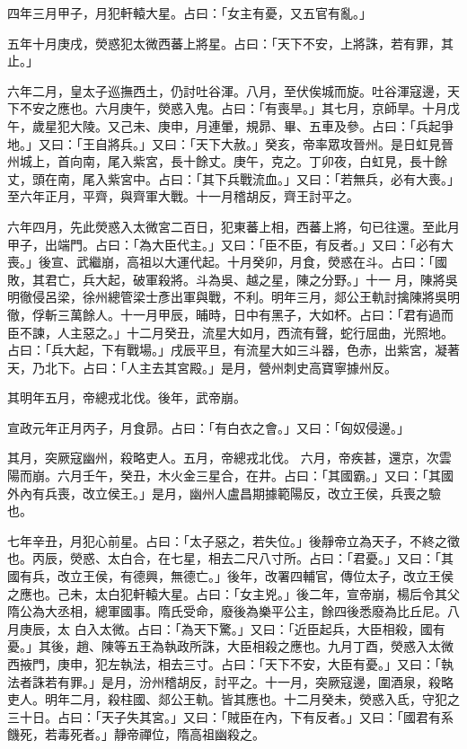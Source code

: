 \begin{pinyinscope}
 四年三月甲子，月犯軒轅大星。占曰：「女主有憂，又五官有亂。」



 五年十月庚戌，熒惑犯太微西蕃上將星。占曰：「天下不安，上將誅，若有罪，其止。」



 六年二月，皇太子巡撫西土，仍討吐谷渾。八月，至伏俟城而旋。吐谷渾寇邊，天下不安之應也。六月庚午，熒惑入鬼。占曰：「有喪旱。」其七月，京師旱。十月戊午，歲星犯大陵。又己未、庚申，月連暈，規昴、畢、五車及參。占曰：「兵起爭
 地。」又曰：「王自將兵。」又曰：「天下大赦。」癸亥，帝率眾攻晉州。是日虹見晉州城上，首向南，尾入紫宮，長十餘丈。庚午，克之。丁卯夜，白虹見，長十餘丈，頭在南，尾入紫宮中。占曰：「其下兵戰流血。」又曰：「若無兵，必有大喪。」至六年正月，平齊，與齊軍大戰。十一月稽胡反，齊王討平之。



 六年四月，先此熒惑入太微宮二百日，犯東蕃上相，西蕃上將，句已往還。至此月甲子，出端門。占曰：「為大臣代主。」又曰：「臣不臣，有反者。」又曰：「必有大喪。」後宣、武繼崩，高祖以大運代起。十月癸卯，月食，熒惑在斗。占曰：「國敗，其君亡，兵大起，破軍殺將。斗為吳、越之星，陳之分野。」十一
 月，陳將吳明徹侵呂梁，徐州總管梁士彥出軍與戰，不利。明年三月，郯公王軌討擒陳將吳明徹，俘斬三萬餘人。十一月甲辰，晡時，日中有黑子，大如杯。占曰：「君有過而臣不諫，人主惡之。」十二月癸丑，流星大如月，西流有聲，蛇行屈曲，光照地。占曰：「兵大起，下有戰場。」戌辰平旦，有流星大如三斗器，色赤，出紫宮，凝著天，乃北下。占曰：「人主去其宮殿。」是月，營州刺史高寶寧據州反。



 其明年五月，帝總戎北伐。後年，武帝崩。



 宣政元年正月丙子，月食昴。占曰：「有白衣之會。」又曰：「匈奴侵邊。」



 其月，突厥寇幽州，殺略吏人。五月，帝總戎北伐。
 六月，帝疾甚，還京，次雲陽而崩。六月壬午，癸丑，木火金三星合，在井。占曰：「其國霸。」又曰：「其國外內有兵喪，改立侯王。」是月，幽州人盧昌期據範陽反，改立王侯，兵喪之驗也。



 七年辛丑，月犯心前星。占曰：「太子惡之，若失位。」後靜帝立為天子，不終之徵也。丙辰，熒惑、太白合，在七星，相去二尺八寸所。占曰：「君憂。」又曰：「其國有兵，改立王侯，有德興，無德亡。」後年，改署四輔官，傳位太子，改立王侯之應也。己未，太白犯軒轅大星。占曰：「女主兇。」後二年，宣帝崩，楊后令其父隋公為大丞相，總軍國事。隋氏受命，廢後為樂平公主，餘四後悉廢為比丘尼。八月庚辰，太
 白入太微。占曰：「為天下驚。」又曰：「近臣起兵，大臣相殺，國有憂。」其後，趙、陳等五王為執政所誅，大臣相殺之應也。九月丁酉，熒惑入太微西掖門，庚申，犯左執法，相去三寸。占曰：「天下不安，大臣有憂。」又曰：「執法者誅若有罪。」是月，汾州稽胡反，討平之。十一月，突厥寇邊，圍酒泉，殺略吏人。明年二月，殺柱國、郯公王軌。皆其應也。十二月癸未，熒惑入氐，守犯之三十日。占曰：「天子失其宮。」又曰：「賊臣在內，下有反者。」又曰：「國君有系饑死，若毒死者。」靜帝禪位，隋高祖幽殺之。




\end{pinyinscope}
